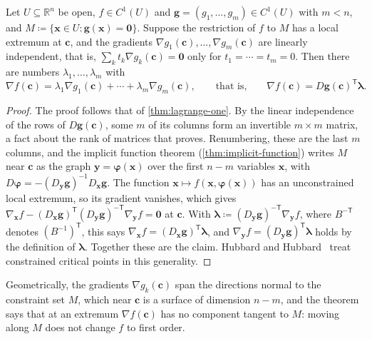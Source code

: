 \begin{theorem}
\label{thm:lagrange}
Let $U\subseteq\mathbb R^n$ be open, $f\in C^1(U)$ and $\mathbf g=(g_1,\ldots,g_m)\in C^1(U)$ with $m<n$, and $M\coloneqq\{\mathbf x\in U: \mathbf g(\mathbf x)=\mathbf0\}$. Suppose the restriction of $f$ to $M$ has a local extremum at $\mathbf c$, and the gradients $\nabla g_1(\mathbf c),\ldots,\nabla g_m(\mathbf c)$ are linearly independent, that is, $\sum_kt_k\nabla g_k(\mathbf c)=\mathbf0$ only for $t_1=\cdots=t_m=0$. Then there are numbers $\lambda_1,\ldots,\lambda_m$ with
\[
\nabla f(\mathbf c)=\lambda_1\nabla g_1(\mathbf c)+\cdots+\lambda_m\nabla g_m(\mathbf c),\qquad\text{that is,}\qquad\nabla f(\mathbf c)=D\mathbf g(\mathbf c)^{\mathsf T}\boldsymbol\lambda .
\]
\end{theorem}

\begin{proof}
The proof follows that of \cref{thm:lagrange-one}. By the linear independence of the rows of $D\mathbf g(\mathbf c)$, some $m$ of its columns form an invertible $m\times m$ matrix, a fact about the rank of matrices that  proves. Renumbering, these are the last $m$ columns, and the implicit function theorem (\cref{thm:implicit-function}) writes $M$ near $\mathbf c$ as the graph $\mathbf y=\boldsymbol\varphi(\mathbf x)$ over the first $n-m$ variables $\mathbf x$, with $D\boldsymbol\varphi=-(D_{\mathbf y}\mathbf g)^{-1}D_{\mathbf x}\mathbf g$. The function $\mathbf x\mapsto f(\mathbf x,\boldsymbol\varphi(\mathbf x))$ has an unconstrained local extremum, so its gradient vanishes, which gives $\nabla_{\mathbf x}f-(D_{\mathbf x}\mathbf g)^{\mathsf T}(D_{\mathbf y}\mathbf g)^{-\mathsf T}\nabla_{\mathbf y}f=\mathbf0$ at $\mathbf c$. With $\boldsymbol\lambda\coloneqq(D_{\mathbf y}\mathbf g)^{-\mathsf T}\nabla_{\mathbf y}f$, where $B^{-\mathsf T}$ denotes $(B^{-1})^{\mathsf T}$, this says $\nabla_{\mathbf x}f=(D_{\mathbf x}\mathbf g)^{\mathsf T}\boldsymbol\lambda$, and $\nabla_{\mathbf y}f=(D_{\mathbf y}\mathbf g)^{\mathsf T}\boldsymbol\lambda$ holds by the definition of $\boldsymbol\lambda$. Together these are the claim. Hubbard and Hubbard~\cite[Sect.~3.7]{hubbard2015vector} treat constrained critical points in this generality.
\end{proof}

Geometrically, the gradients $\nabla g_k(\mathbf c)$ span the directions normal to the constraint set $M$, which near $\mathbf c$ is a surface of dimension $n-m$, and the theorem says that at an extremum $\nabla f(\mathbf c)$ has no component tangent to $M$: moving along $M$ does not change $f$ to first order.

